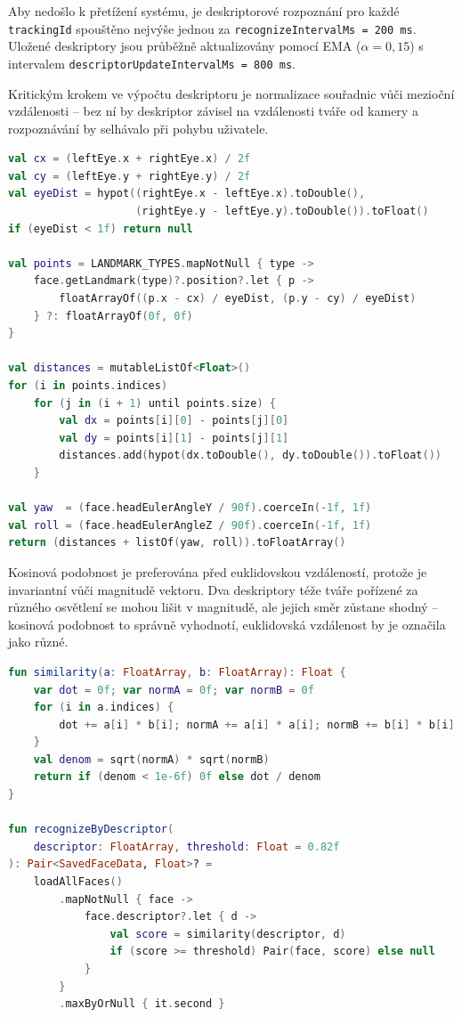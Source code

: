 \documentclass[FM,BP,CZ]{tulthesis}
\begin{document}
Aby nedošlo k přetížení systému, je deskriptorové rozpoznání pro každé \texttt{trackingId} spouštěno nejvýše jednou za \texttt{recognizeIntervalMs = 200\,ms}. Uložené deskriptory jsou průběžně aktualizovány pomocí EMA (\(\alpha = 0{,}15\)) s intervalem \texttt{descriptorUpdateIntervalMs = 800\,ms}.

Kritickým krokem ve výpočtu deskriptoru je normalizace souřadnic vůči mezioční vzdálenosti – bez ní by deskriptor závisel na vzdálenosti tváře od kamery a rozpoznávání by selhávalo při pohybu uživatele.

\begin{lstlisting}[language=Kotlin, caption={Výpočet geometrického deskriptoru ve \texttt{FaceDescriptor.compute()}}, label=lst:descriptor]
val cx = (leftEye.x + rightEye.x) / 2f
val cy = (leftEye.y + rightEye.y) / 2f
val eyeDist = hypot((rightEye.x - leftEye.x).toDouble(),
                    (rightEye.y - leftEye.y).toDouble()).toFloat()
if (eyeDist < 1f) return null

val points = LANDMARK_TYPES.mapNotNull { type ->
    face.getLandmark(type)?.position?.let { p ->
        floatArrayOf((p.x - cx) / eyeDist, (p.y - cy) / eyeDist)
    } ?: floatArrayOf(0f, 0f)
}

val distances = mutableListOf<Float>()
for (i in points.indices)
    for (j in (i + 1) until points.size) {
        val dx = points[i][0] - points[j][0]
        val dy = points[i][1] - points[j][1]
        distances.add(hypot(dx.toDouble(), dy.toDouble()).toFloat())
    }

val yaw  = (face.headEulerAngleY / 90f).coerceIn(-1f, 1f)
val roll = (face.headEulerAngleZ / 90f).coerceIn(-1f, 1f)
return (distances + listOf(yaw, roll)).toFloatArray()
\end{lstlisting}

Kosinová podobnost je preferována před euklidovskou vzdáleností, protože je invariantní vůči magnitudě vektoru. Dva deskriptory téže tváře pořízené za různého osvětlení se mohou lišit v magnitudě, ale jejich směr zůstane shodný – kosinová podobnost to správně vyhodnotí, euklidovská vzdálenost by je označila jako různé.

\begin{lstlisting}[language=Kotlin, caption={Kosinová podobnost a rozpoznávání v databázi}, label=lst:cosine]
fun similarity(a: FloatArray, b: FloatArray): Float {
    var dot = 0f; var normA = 0f; var normB = 0f
    for (i in a.indices) {
        dot += a[i] * b[i]; normA += a[i] * a[i]; normB += b[i] * b[i]
    }
    val denom = sqrt(normA) * sqrt(normB)
    return if (denom < 1e-6f) 0f else dot / denom
}

fun recognizeByDescriptor(
    descriptor: FloatArray, threshold: Float = 0.82f
): Pair<SavedFaceData, Float>? =
    loadAllFaces()
        .mapNotNull { face ->
            face.descriptor?.let { d ->
                val score = similarity(descriptor, d)
                if (score >= threshold) Pair(face, score) else null
            }
        }
        .maxByOrNull { it.second }
\end{lstlisting}
\end{document}
